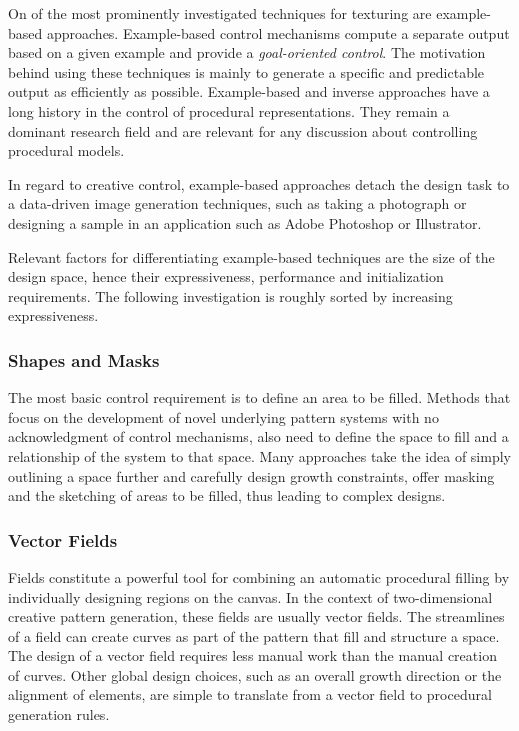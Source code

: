 On of the most prominently investigated techniques for texturing are example-based approaches. Example-based control mechanisms compute a separate output based on a given example and provide a \textit{goal-oriented control}. The motivation behind using these techniques is mainly to generate a specific and predictable output as efficiently as possible. Example-based and inverse approaches have a long history in the control of procedural representations. They remain a dominant research field and are relevant for any discussion about controlling procedural models. 

In regard to creative control, example-based approaches detach the design task to a data-driven image generation techniques, such as taking a photograph or designing a sample in an application such as Adobe Photoshop or Illustrator.

Relevant factors for differentiating example-based techniques are the size of the design space, hence their expressiveness, performance and initialization requirements. The following investigation is roughly sorted by increasing expressiveness.

\subsubsection{Shapes and Masks}
\label{subsubsec:commonly_used_control_mechanisms_shapes}

The most basic control requirement is to define an area to be filled. Methods that focus on the development of novel underlying pattern systems with no acknowledgment of control mechanisms, also need to define the space to fill and a relationship of the system to that space. Many approaches take the idea of simply outlining a space further and carefully design growth constraints, offer masking and the sketching of areas to be filled, thus leading to complex designs. 

\subsubsection{Vector Fields}
\label{subsubsec:commonly_used_control_mechanisms_fields}

Fields constitute a powerful tool for combining an automatic procedural filling by individually designing regions on the canvas. In the context of two-dimensional creative pattern generation, these fields are usually vector fields. The streamlines of a field can create curves as part of the pattern that fill and structure a space. The design of a vector field requires less manual work than the manual creation of curves. Other global design choices, such as an overall growth direction or the alignment of elements, are simple to translate from a vector field to procedural generation rules.

